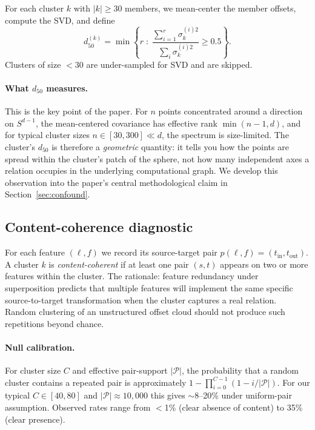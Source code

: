 \documentclass[11pt,letterpaper]{article}
\begin{document}
For each cluster $k$ with $|k| \geq 30$ members, we mean-center the member offsets, compute the SVD, and define
\[
d_{50}^{(k)} = \min\left\{r \;:\; \frac{\sum_{i=1}^r \sigma_k^{(i)2}}{\sum_i \sigma_k^{(i)2}} \geq 0.5 \right\}.
\]
Clusters of size $< 30$ are under-sampled for SVD and are skipped.

\paragraph{What $d_{50}$ measures.} This is the key point of the paper. For $n$ points concentrated around a direction on $S^{d-1}$, the mean-centered covariance has effective rank $\min(n-1, d)$, and for typical cluster sizes $n \in [30, 300] \ll d$, the spectrum is size-limited. The cluster's $d_{50}$ is therefore a \emph{geometric} quantity: it tells you how the points are spread within the cluster's patch of the sphere, not how many independent axes a relation occupies in the underlying computational graph. We develop this observation into the paper's central methodological claim in Section~\ref{sec:confound}.

\subsection{Content-coherence diagnostic}
\label{sec:coherence}

For each feature $(\ell, f)$ we record its source-target pair $p(\ell, f) = (t_{\mathrm{in}}, t_{\mathrm{out}})$. A cluster $k$ is \emph{content-coherent} if at least one pair $(s, t)$ appears on two or more features within the cluster. The rationale: feature redundancy under superposition \citep{elhage2022toy} predicts that multiple features will implement the same specific source-to-target transformation when the cluster captures a real relation. Random clustering of an unstructured offset cloud should not produce such repetitions beyond chance.

\paragraph{Null calibration.} For cluster size $C$ and effective pair-support $|\mathcal{P}|$, the probability that a random cluster contains a repeated pair is approximately $1 - \prod_{i=0}^{C-1}(1 - i/|\mathcal{P}|)$. For our typical $C \in [40, 80]$ and $|\mathcal{P}| \approx 10{,}000$ this gives $\sim$8--20\% under uniform-pair assumption. Observed rates range from $<$1\% (clear absence of content) to 35\% (clear presence).
\end{document}
